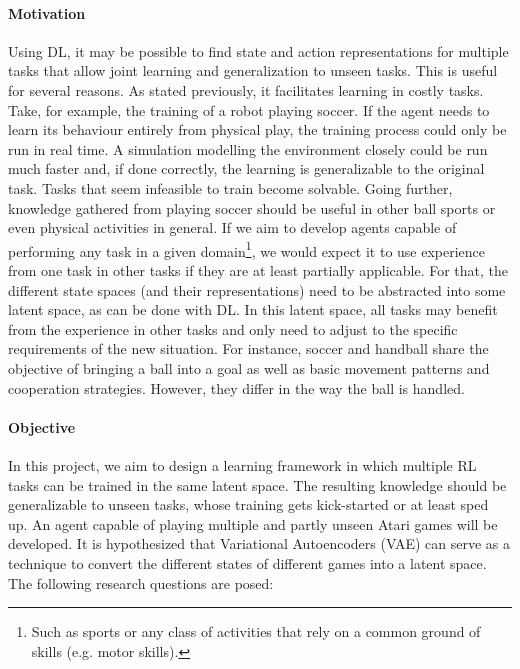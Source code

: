 \paragraph{Motivation} Using DL, it may be possible to find state and action representations for multiple tasks that allow joint learning and generalization to unseen tasks. This is useful for several reasons. As stated previously, it facilitates learning in costly tasks. Take, for example, the training of a robot playing soccer. If the agent needs to learn its behaviour entirely from physical play, the training process could only be run in real time. A simulation modelling the environment closely could be run much faster and, if done correctly, the learning is generalizable to the original task. Tasks that seem infeasible to train become solvable. Going further, knowledge gathered from playing soccer should be useful in other ball sports or even physical activities in general. If we aim to develop agents capable of performing any task in a given domain\footnote{Such as sports or any class of activities that rely on a common ground of skills (e.g. motor skills).}, we would expect it to use experience from one task in other tasks if they are at least partially applicable. For that, the different state spaces (and their representations) need to be abstracted into some latent space, as can be done with DL. In this latent space, all tasks may benefit from the experience in other tasks and only need to adjust to the specific requirements of the new situation. For instance, soccer and handball share the objective of bringing a ball into a goal as well as basic movement patterns and cooperation strategies. However, they differ in the way the ball is handled.

\paragraph{Objective} In this project, we aim to design a learning framework in which multiple RL tasks can be trained in the same latent space. The resulting knowledge should be generalizable to unseen tasks, whose training gets kick-started or at least sped up. An agent capable of playing multiple and partly unseen Atari games will be developed. It is hypothesized that Variational Autoencoders (VAE) can serve as a technique to convert the different states of different games into a latent space. The following research questions are posed:

	\begin{researchquestion} 
	\end{researchquestion}	
	
